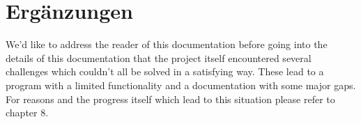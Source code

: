 \section{Ergänzungen}
\label{sec:Ergänzungen}

We'd like to address the reader of this documentation before going into the details of this documentation that the project itself encountered several challenges which couldn't all be solved in a satisfying way. These lead to a program with a limited functionality and a documentation with some major gaps. For reasons and the progress itself which lead to this situation please refer to chapter 8.